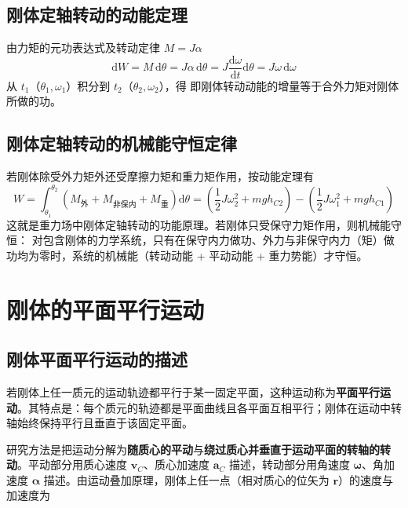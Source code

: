     \subsection{刚体定轴转动的动能定理}
    由力矩的元功表达式及转动定律 $M=J\alpha$
    \[
    \mathrm{d}W=M\,\mathrm{d}\theta=J\alpha\,\mathrm{d}\theta
    =J\frac{\mathrm{d}\omega}{\mathrm{d}t}\mathrm{d}\theta=J\omega\,\mathrm{d}\omega
    \]
    从 $t_{1}$（$\theta_{1},\omega_{1}$）积分到 $t_{2}$（$\theta_{2},\omega_{2}$），得
    即刚体转动动能的增量等于合外力矩对刚体所做的功。

    \subsection{刚体定轴转动的机械能守恒定律}
    若刚体除受外力矩外还受摩擦力矩和重力矩作用，按动能定理有
    \[
    W=\int_{\theta_{1}}^{\theta_{2}}\left(M_{\text{外}}+M_{\text{非保内}}+M_{\text{重}}\right)\mathrm{d}\theta
    =\left(\frac{1}{2}J\omega_{2}^{2}+mgh_{C2}\right)-\left(\frac{1}{2}J\omega_{1}^{2}+mgh_{C1}\right)
    \]
    这就是重力场中刚体定轴转动的功能原理。若刚体只受保守力矩作用，则机械能守恒：
    对包含刚体的力学系统，只有在保守内力做功、外力与非保守内力（矩）做功均为零时，系统的机械能（转动动能 + 平动动能 + 重力势能）才守恒。

\section{刚体的平面平行运动}
    \subsection{刚体平面平行运动的描述}
    若刚体上任一质元的运动轨迹都平行于某一固定平面，这种运动称为\textbf{平面平行运动}。其特点是：每个质元的轨迹都是平面曲线且各平面互相平行；刚体在运动中转轴始终保持平行且垂直于该固定平面。

    研究方法是把运动分解为\textbf{随质心的平动}与\textbf{绕过质心并垂直于运动平面的转轴的转动}。平动部分用质心速度 $\boldsymbol{v}_{C}$、质心加速度 $\boldsymbol{a}_{C}$ 描述，转动部分用角速度 $\boldsymbol{\omega}$、角加速度 $\boldsymbol{\alpha}$ 描述。由运动叠加原理，刚体上任一点（相对质心的位矢为 $\boldsymbol{r}$）的速度与加速度为

